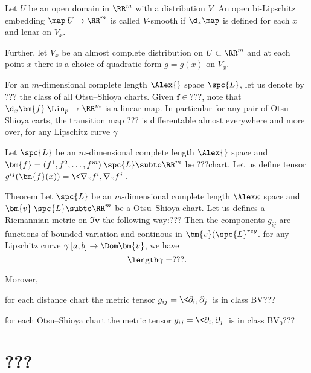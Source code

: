 Let $U$ be an open domain in $\RR^m$ with a distribution $V$.
An open bi-Lipschitz embedding $\map\:U\to \RR^m$ is called $V$-smooth if 
$\d_x\map$ is defined for each $x$ and lenar on $V_x$.

Further, let $V_x$ be an almost complete distribution on $U\subset \RR^m$
and at each point $x$ there is a choice of quadratic form $g=g(x)$ on $V_x$.
 

For an $m$-dimensional complete length $\Alex{}$ space $\spc{L}$, let us denote by $???$ the class of all Otsu--Shioya charts.
Given $\bm{f}\in???$, note that $\d_x\bm{f}\:\Lin_p\to\RR^m$ is a linear map.
In particular for any pair of Otsu--Shioya carts,
the transition map ??? is differentable almost everywhere and more over,
for any Lipschitz curve $\gamma$

Let $\spc{L}$ be an $m$-dimensional complete length $\Alex{}$ space 
and $\bm{f}=(f^1,f^2,\dots,f^m)\:\spc{L}\subto\RR^m$ be ???chart.
Let us define tensor $g^{ij}(\bm{f}(x))=\<\nabla_x f^i,\nabla_x f^j\>$.

\begin{thm}{Theorem}
Let $\spc{L}$ be an $m$-dimensional complete length $\Alex\kappa$ space
and $\bm{v}\:\spc{L}\subto\RR^m$ be a Otsu--Shioya chart.
Let us defines a Riemannian metric on $\Im \bm{v}$ the following way:???
Then the components $g_{ij}$ are functions of bounded variation and  continous in $\bm{v}(\spc{L}^{reg}$.
for any Lipschitz curve $\gamma\:[a,b]\to\Dom\bm{v}$, we have
\[\length\gamma= ???.\]


Morover, 

for each distance chart 
the metric tensor $g_{ij}=\<\partial_i,\partial_j\>$ is in class BV???

for each Otsu--Shioya chart 
the metric tensor $g_{ij}=\<\partial_i,\partial_j\>$ is in class BV$_0$???
\end{thm}


\section{???}

